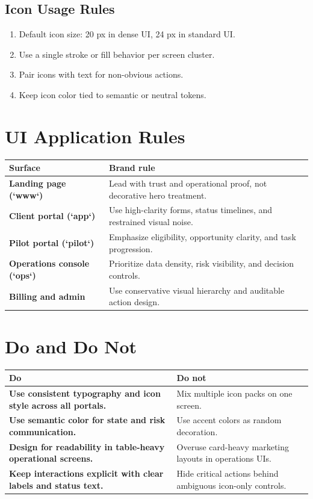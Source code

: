 \documentclass[11pt,a4paper]{article}
\begin{document}
\subsection{Icon Usage Rules}

\begin{enumerate}[leftmargin=*]
    \item Default icon size: 20 px in dense UI, 24 px in standard UI.
    \item Use a single stroke or fill behavior per screen cluster.
    \item Pair icons with text for non-obvious actions.
    \item Keep icon color tied to semantic or neutral tokens.
\end{enumerate}

\section{UI Application Rules}

\begin{longtable}{>{\bfseries}p{}p{}}
\toprule
Surface & Brand rule \\
\midrule
Landing page (`www`) & Lead with trust and operational proof, not decorative hero treatment. \\
Client portal (`app`) & Use high-clarity forms, status timelines, and restrained visual noise. \\
Pilot portal (`pilot`) & Emphasize eligibility, opportunity clarity, and task progression. \\
Operations console (`ops`) & Prioritize data density, risk visibility, and decision controls. \\
Billing and admin & Use conservative visual hierarchy and auditable action design. \\
\bottomrule
\end{longtable}

\section{Do and Do Not}

\begin{longtable}{>{\bfseries}p{}p{}}
\toprule
Do & Do not \\
\midrule
Use consistent typography and icon style across all portals. & Mix multiple icon packs on one screen. \\
Use semantic color for state and risk communication. & Use accent colors as random decoration. \\
Design for readability in table-heavy operational screens. & Overuse card-heavy marketing layouts in operations UIs. \\
Keep interactions explicit with clear labels and status text. & Hide critical actions behind ambiguous icon-only controls. \\
\bottomrule
\end{longtable}
\end{document}

